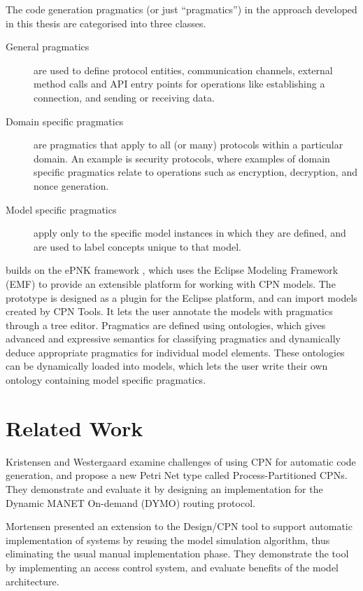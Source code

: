 The code generation pragmatics (or just ``pragmatics'') in the approach
developed in this thesis are categorised into three classes.
\begin{description}
	\item[General pragmatics] are used to define protocol entities, communication
	channels, external method calls and API entry points for operations like
	establishing a connection, and sending or receiving data.
	\item[Domain specific pragmatics] are pragmatics that apply to all (or many)
	protocols within a particular domain. An example is security protocols, where
	examples of domain specific pragmatics relate to operations such as
	encryption, decryption, and nonce generation.
	\item[Model specific pragmatics] apply only to the specific model instances in
	which they are defined, and are used to label concepts unique to that model. 
\end{description}

\thename{} builds on the ePNK framework \cite{kindler2011epnk}, which uses the
Eclipse Modeling Framework (EMF) to provide an extensible platform for working
with CPN models. The prototype is designed as a plugin for the Eclipse platform,
and can import models created by CPN Tools. It lets the user annotate the models
with pragmatics through a tree editor. Pragmatics are defined using ontologies,
which gives advanced and expressive semantics for classifying pragmatics and
dynamically deduce appropriate pragmatics for individual model elements. These
ontologies can be dynamically loaded into models, which lets the user write
their own ontology containing model specific pragmatics.

\section{Related Work}

Kristensen and Westergaard \cite{kristensen2010automatic} examine challenges of
using CPN for automatic code generation, and propose a new Petri Net type called
Process-Partitioned CPNs. They demonstrate and evaluate it by
designing an implementation for the Dynamic MANET On-demand (DYMO) routing
protocol.

Mortensen \cite{mortensen2000automatic} presented an extension to the Design/CPN
tool to support automatic implementation of systems by reusing the model
simulation algorithm, thus eliminating the usual manual implementation phase.
They demonstrate the tool by implementing an access control system, and
evaluate benefits of the model architecture.


